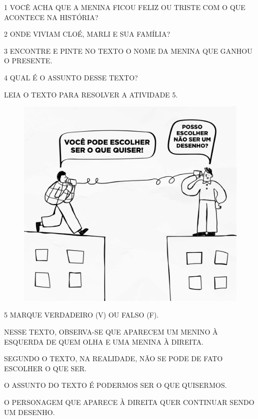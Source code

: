 \num{1} VOCÊ ACHA QUE A MENINA FICOU FELIZ OU TRISTE COM O QUE ACONTECE NA HISTÓRIA?


\num{2} ONDE VIVIAM CLOÉ, MARLI E SUA FAMÍLIA?


\num{3} ENCONTRE E PINTE NO TEXTO O NOME DA MENINA QUE GANHOU O PRESENTE. 

\vspace{0.5cm}

\num{4} QUAL É O ASSUNTO DESSE TEXTO?



LEIA O TEXTO PARA RESOLVER A ATIVIDADE 5.

\begin{figure}[H]
\includegraphics[width=\textwidth]{media/image164.jpg}
\end{figure}

\num{5} MARQUE VERDADEIRO (V) OU FALSO (F).

\begin{boxlist}
 NESSE TEXTO, OBSERVA-SE QUE APARECEM UM MENINO À ESQUERDA DE QUEM OLHA E UMA MENINA À DIREITA.

 SEGUNDO O TEXTO, NA REALIDADE, NÃO SE PODE DE FATO ESCOLHER O QUE SER.

 O ASSUNTO DO TEXTO É PODERMOS SER O QUE QUISERMOS.

 O PERSONAGEM QUE APARECE À DIREITA QUER CONTINUAR SENDO UM DESENHO.
\end{boxlist}

